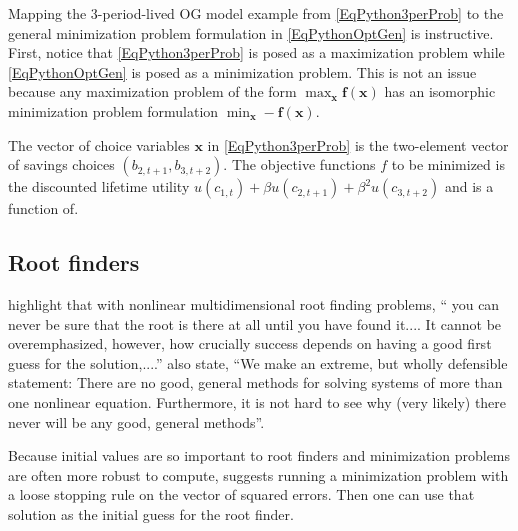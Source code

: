   Mapping the 3-period-lived OG model example from \eqref{EqPython3perProb} to the general minimization problem formulation in \eqref{EqPythonOptGen} is instructive. First, notice that \eqref{EqPython3perProb} is posed as a maximization problem while \eqref{EqPythonOptGen} is posed as a minimization problem. This is not an issue because any maximization problem of the form $\max_{\bm{x}}\bm{f}(\bm{x})$ has an isomorphic minimization problem formulation $\min_{\bm{x}} -\bm{f}(\bm{x})$.

  The vector of choice variables $\bm{x}$ in \eqref{EqPython3perProb} is the two-element vector of savings choices $(b_{2,t+1}, b_{3,t+2})$. The objective functions $f$ to be minimized is the discounted lifetime utility $u(c_{1,t}) + \beta u(c_{2,t+1}) + \beta^2 u(c_{3,t+2})$ and is a function of.


  \subsection{Root finders}\label{SecPythonRoot}

    \citet[p.442-443]{PressEtAl:2007} highlight that with nonlinear multidimensional root finding problems, `` you can never be sure that the root is there at all until you have found it.... It cannot be overemphasized, however, how crucially success depends on having a good first guess for the solution,....'' \citet[p. 473]{PressEtAl:2007} also state, ``We make an extreme, but wholly defensible statement: There are no good, general methods for solving systems of more than one nonlinear equation. Furthermore, it is not hard to see why (very likely) there never will be any good, general methods''.

    Because initial values are so important to root finders and minimization problems are often more robust to compute, \citet[p.172]{Judd:1998} suggests running a minimization problem with a loose stopping rule on the vector of squared errors. Then one can use that solution as the initial guess for the root finder.
